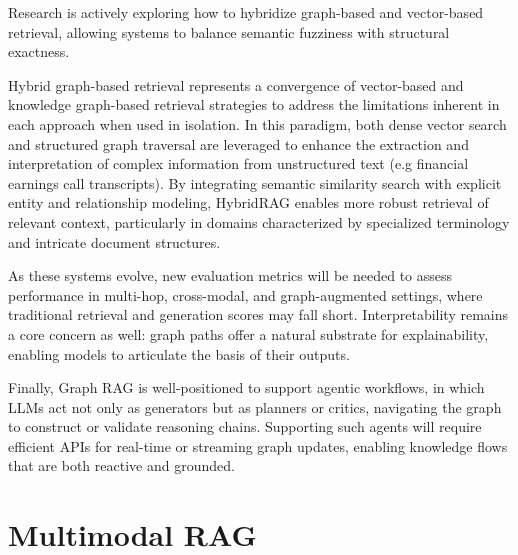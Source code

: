 \documentclass[12pt,twoside]{report}
\begin{document}
Research is actively exploring how to hybridize graph-based and vector-based retrieval, allowing systems to balance semantic fuzziness with structural exactness\cite{HybridRAG}.


Hybrid graph-based retrieval represents a convergence of vector-based and knowledge graph-based retrieval strategies to address the limitations inherent in each approach when used in isolation. In this paradigm, both dense vector search and structured graph traversal are leveraged to enhance the extraction and interpretation of complex information from unstructured text (e.g financial earnings call transcripts). By integrating semantic similarity search with explicit entity and relationship modeling, HybridRAG enables more robust retrieval of relevant context, particularly in domains characterized by specialized terminology and intricate document structures.

As these systems evolve, new evaluation metrics will be needed to assess performance in multi-hop, cross-modal, and graph-augmented settings, where traditional retrieval and generation scores may fall short. Interpretability remains a core concern as well: graph paths offer a natural substrate for explainability, enabling models to articulate the basis of their outputs.

Finally, Graph RAG is well-positioned to support agentic workflows, in which LLMs act not only as generators but as planners or critics, navigating the graph to construct or validate reasoning chains. Supporting such agents will require efficient APIs for real-time or streaming graph updates, enabling knowledge flows that are both reactive and grounded.


\section{Multimodal RAG}
\end{document}
